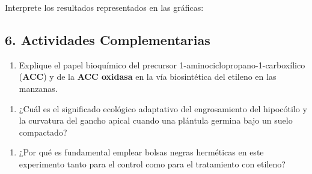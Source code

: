 \documentclass[
  spanish,
  10pt,
  letterpaper,
  twocolumn]{article}
\providecommand{\tightlist}{%
  \setlength{\itemsep}{0pt}\setlength{\parskip}{0pt}}
\begin{document}
Interprete los resultados representados en las gráficas:

\hrulefill

\hrulefill

\hrulefill

\hrulefill

\hrulefill

\hrulefill

\subsection{6. Actividades
Complementarias}\label{actividades-complementarias}

\begin{enumerate}
\def\labelenumi{\arabic{enumi}.}
\tightlist
\item
  Explique el papel bioquímico del precursor
  1-aminociclopropano-1-carboxílico (\textbf{ACC}) y de la \textbf{ACC
  oxidasa} en la vía biosintética del etileno en las manzanas.
\end{enumerate}

\hrulefill

\hrulefill

\hrulefill

\hrulefill

\hrulefill

\hrulefill

\begin{enumerate}
\def\labelenumi{\arabic{enumi}.}
\setcounter{enumi}{1}
\tightlist
\item
  ¿Cuál es el significado ecológico adaptativo del engrosamiento del
  hipocótilo y la curvatura del gancho apical cuando una plántula
  germina bajo un suelo compactado?
\end{enumerate}

\hrulefill

\hrulefill

\hrulefill

\hrulefill

\hrulefill

\hrulefill

\begin{enumerate}
\def\labelenumi{\arabic{enumi}.}
\setcounter{enumi}{2}
\tightlist
\item
  ¿Por qué es fundamental emplear bolsas negras herméticas en este
  experimento tanto para el control como para el tratamiento con
  etileno?
\end{enumerate}

\hrulefill
\end{document}
